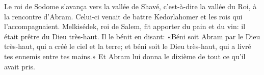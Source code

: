 Le roi de Sodome s’avança vers la vallée de Shavé,
	c’est-à-dire la vallée du Roi, à la rencontre d’Abram.
	Celui-ci venait de battre Kedorlahomer et les rois qui l’accompagnaient.
Melkisédek, roi de Salem, fit apporter du pain et du vin:
	il était prêtre du Dieu très-haut.
Il le bénit en disant:
	«Béni soit Abram par le Dieu très-haut, qui a créé le ciel et la terre;
	et béni soit le Dieu très-haut, qui a livré tes ennemis entre tes mains.»
Et Abram lui donna le dixième de tout ce qu’il avait pris.
